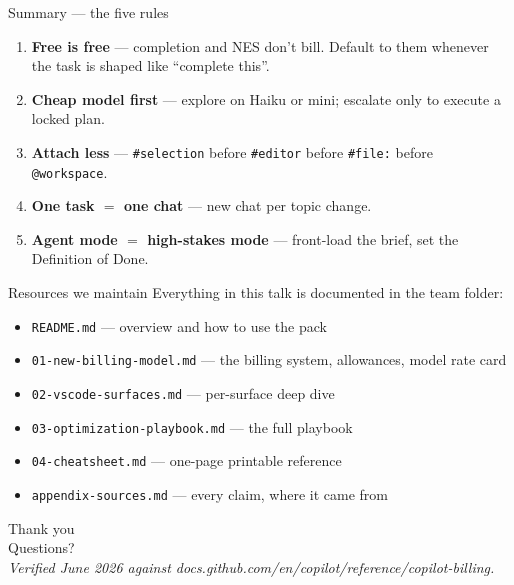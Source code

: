 \documentclass[11pt,aspectratio=169]{beamer}
\newcommand{\hl}[1]{\textbf{\textcolor{accentblue}{#1}}}
\begin{document}
\begin{frame}{Summary --- the five rules}
  \begin{enumerate}
    \item \hl{Free is free} --- completion and NES don't bill. Default to them whenever the task is shaped like ``complete this''.
    \item \hl{Cheap model first} --- explore on Haiku or mini; escalate only to execute a locked plan.
    \item \hl{Attach less} --- \texttt{\#selection} before \texttt{\#editor} before \texttt{\#file:} before \texttt{@workspace}.
    \item \hl{One task $=$ one chat} --- new chat per topic change.
    \item \hl{Agent mode $=$ high-stakes mode} --- front-load the brief, set the Definition of Done.
  \end{enumerate}
\end{frame}

\begin{frame}{Resources we maintain}
  Everything in this talk is documented in the team folder:
  \begin{itemize}
    \item \texttt{README.md} --- overview and how to use the pack
    \item \texttt{01-new-billing-model.md} --- the billing system, allowances, model rate card
    \item \texttt{02-vscode-surfaces.md} --- per-surface deep dive
    \item \texttt{03-optimization-playbook.md} --- the full playbook
    \item \texttt{04-cheatsheet.md} --- one-page printable reference
    \item \texttt{appendix-sources.md} --- every claim, where it came from
  \end{itemize}
\end{frame}

\begin{frame}[plain]
  \begin{center}
    {\Huge Thank you}\\[1.2em]
    {\Large Questions?}\\[2.4em]
    \small \textit{Verified June 2026 against docs.github.com/en/copilot/reference/copilot-billing.}
  \end{center}
\end{frame}
\end{document}
